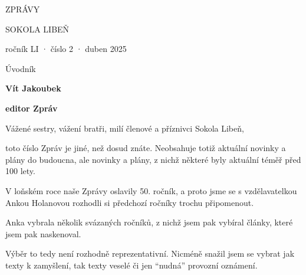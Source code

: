 \documentclass[11pt]{article}
\begin{document}
\pagecolor{sokolred}
\color{white}
\begin{center}

\vspace*{\fill}

{\titlesize \fugner ZPRÁVY}

{\titlesize \tyrs SOKOLA LIBEŇ}

\vspace*{1cm}

{\large ročník LI · číslo 2 · duben 2025}

\vspace*{\fill}
\end{center}

\clearpage
\normalcolor
\nopagecolor
{}

\pagestyle{uvodnik}


\clearpage

\pagestyle{uvodnik}

\setlength{\columnsep}{-2.5cm}
\begin{multicols}{2}
  {\fontsize{48pt}{57pt} \fugner \color{sokolred} \noindent Úvodník}

  \columnbreak

  \vspace*{-4pt}

  {\hfill\textbf{Vít Jakoubek}}
  
  {\hfill\textbf{editor Zpráv}}
 \end{multicols}

\vspace*{12pt}

\noindent
Vážené sestry, vážení bratři, milí členové a příznivci Sokola Libeň,

\noindent
toto číslo Zpráv je jiné, než dosud znáte. Neobsahuje totiž aktuální
novinky a plány do budoucna, ale novinky a plány, z nichž některé byly
aktuální téměř před 100 lety.

V loňském roce naše Zprávy oslavily 50. ročník, a proto jsme se s
vzdělavatelkou Ankou Holanovou rozhodli si předchozí ročníky trochu
připomenout.

Anka vybrala několik svázaných ročníků, z nichž jsem pak vybíral články,
které jsem pak naskenoval.

Výběr to tedy není rozhodně reprezentativní. Nicméně snažil jsem se
vybrat jak texty k zamyšlení, tak texty veselé či jen ``nudná'' provozní
oznámení.
\end{document}
